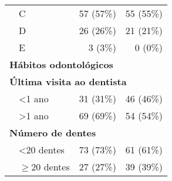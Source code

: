 \begin{table}[h!]
\begin{tabular}{llrr}
 & C                                      & 57 (57\%)                                                                              & 55 (55\%)                                                                         \\
 & D                                      & 26 (26\%)                                                                              & 21 (21\%)                                                                         \\
 & E                                      & 3 (3\%)                                                                                & 0 (0\%)                                                                           \\ \hline
\multicolumn{4}{l}{\cellcolor[HTML]{9B9B9B}\textbf{Hábitos odontológicos}}                                                                                                                                             \\ \hline
\multicolumn{4}{l}{\textbf{Última visita ao dentista}}                                                                                                                                                                 \\
 & \textless 1 ano                        & 31 (31\%)                                                                              & 46 (46\%)                                                                         \\
 & \textgreater 1 ano                     & 69 (69\%)                                                                              & 54 (54\%)                                                                         \\ \hline
\multicolumn{4}{l}{\textbf{Número de dentes}}                                                                                                                                                                          \\
 & \textless 20 dentes                    & 73 (73\%)                                                                              & 61 (61\%)                                                                         \\
 & $\geq$20 dentes                            & 27 (27\%)                                                                              & 39 (39\%)                                                                         \\ \hline

\end{tabular}
\end{table}
